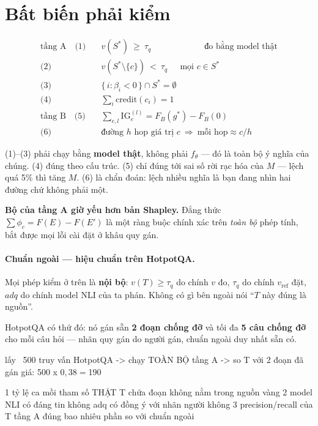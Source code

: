\documentclass[11pt,a4paper]{article}
\begin{document}
\section{Bất biến phải kiểm}

\begin{align*}
\text{tầng A}\quad
\text{(1)}\quad & v(S^*)\ \ge\ \tau_q \qquad\qquad\qquad\ \text{đo bằng model thật}\\
\text{(2)}\quad & v(S^*\setminus\{c\})\ <\ \tau_q \quad\ \ \text{mọi } c\in S^*\\
\text{(3)}\quad & \{\,i:\beta_i<0\,\}\cap S^*=\emptyset\\
\text{(4)}\quad & \textstyle\sum_i \mathrm{credit}(c_i)=1\\[4pt]
\text{tầng B}\quad
\text{(5)}\quad & \sum_{e,l}\mathrm{IG}_e^{(l)}=F_B(g^\ast)-F_B(0)\\
\text{(6)}\quad & \text{đường } h \text{ hop giá trị } c \ \Longrightarrow\ \text{mỗi hop}\approx c/h
\end{align*}

(1)--(3) phải chạy bằng \textbf{model thật}, không phải $f_\theta$ --- đó là toàn bộ ý nghĩa
của chúng. (4) đúng theo cấu trúc. (5) chỉ đúng tới sai số rời rạc hóa của $M$ --- lệch quá
5\% thì tăng $M$. (6) là chẩn đoán: lệch nhiều nghĩa là bạn đang nhìn hai đường chứ không
phải một.

\textbf{Bộ của tầng A giờ yếu hơn bản Shapley.} Đẳng thức $\sum\phi_c=F(E)-F(E')$ là một
ràng buộc chính xác trên \emph{toàn bộ} phép tính, bắt được mọi lỗi cài đặt ở khâu quy gán.
\paragraph{Chuẩn ngoài --- hiệu chuẩn trên HotpotQA.} Mọi phép kiểm ở trên là \textbf{nội
bộ}: $v(T)\ge\tau_q$ do chính $v$ đo, $\tau_q$ do chính $v_{\text{ref}}$ đặt, $adq$ do chính
model NLI của ta phán. Không có gì bên ngoài nói ``$T$ này đúng là nguồn''.

HotpotQA có thứ đó: nó gán sẵn \textbf{2 đoạn chống đỡ} và tối đa \textbf{5 câu chống đỡ} cho
mỗi câu hỏi --- nhãn quy gán do người gán, chuẩn ngoài duy nhất sẵn có.

\begin{dia}
lấy ~500 truy vấn HotpotQA -> chạy TOÀN BỘ tầng A -> so T với 2 đoạn đã gán
giá:  500 x $0,38  =  $190

1  tỷ lệ ca mồi tham số THẬT    T chứa đoạn không nằm trong nguồn vàng
2  model NLI có đáng tin không   adq có đồng ý với nhãn người không
3  precision/recall của T        tầng A đúng bao nhiêu phần so với chuẩn ngoài
\end{dia}
\end{document}
